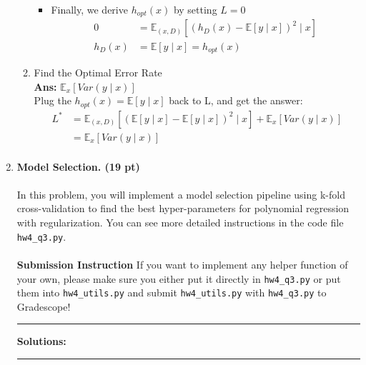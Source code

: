 \documentclass{article}
\theoremstyle{definition}
\theoremstyle{remark}
\newenvironment{Q}
    {%
      \clearpage
      \item
    }
    {%
      \phantom{s}
      \bigskip
    \hrule
    \vspace{1em}
      \textbf{Solutions: } \\
    \hrule
    }
\begin{document}
\begin{enumerate}[font={\Large\bfseries},left=0pt]
\begin{enumerate}
\begin{itemize}
			      \item Finally, we derive $h_{opt}(x)$ by setting $L = 0$
			            \begin{align}
				            0      & =  \mathbb{E}_{(x, D)}\left[\left(h_D(x) - \mathbb{E}\left[ y \mid x\right]\right)^2 \mid  x \right] \\
				            h_D(x) & =  \mathbb{E}\left[ y \mid x\right] = h_{opt}(x)
			            \end{align}
		      \end{itemize}
		\item Find the Optimal Error Rate \\
		      \textbf{Ans: }$\mathbb{E}_x\left[{Var(y \mid x)}\right]$ \\
		      Plug the $h_{opt}(x) = \mathbb{E}\left[y \mid x \right]$ back to L, and get the answer: \\
		      \begin{align}
			      L^* & = \mathbb{E}_{(x, D)}\left[\left(\mathbb{E}\left[y \mid x \right] - \mathbb{E}\left[ y \mid x\right]\right)^2 \mid  x \right] + \mathbb{E}_{x}\left[ Var(y \mid x)\right] \\
			          & = \mathbb{E}_{x}\left[Var(y \mid x) \right]                                                                                                                               \\
		      \end{align}
	\end{enumerate}

	\begin{Q}
		\textbf{\Large Model Selection. \textbf{(19 pt)}}
		\\ \\ In this problem, you will implement a  model selection pipeline using k-fold cross-validation to find the best hyper-parameters for polynomial regression with regularization. You can see more detailed instructions in the code file \texttt{hw4\_q3.py}. \\ \\
		\textbf{Submission Instruction} If you want to implement any helper function of your own, please make sure you either put it directly in \texttt{hw4\_q3.py} or put them into \texttt{hw4\_utils.py} and submit \texttt{hw4\_utils.py} with \texttt{hw4\_q3.py} to Gradescope!


\end{Q}
\end{enumerate}
\end{document}
